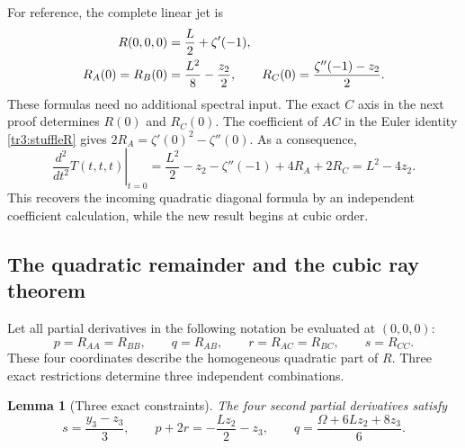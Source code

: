 \documentclass[11pt]{article}
\numberwithin{equation}{section}
\theoremstyle{plain}
\newtheorem{lemma}[theorem]{Lemma}
\theoremstyle{definition}
\theoremstyle{remark}
\begin{document}
For reference, the complete linear jet is
\begin{align}\label{tr3:linearjet}
 R(0,0,0)&=\frac L2+\zeta'(-1),\notag\\
 R_A(0)=R_B(0)&=\frac{L^2}{8}-\frac{z_2}{2},\qquad
 R_C(0)=\frac{\zeta''(-1)-z_2}{2}.
\end{align}
These formulas need no additional spectral input.  The exact $C$ axis
in the next proof determines $R(0)$ and $R_C(0)$.  The coefficient of
$AC$ in the Euler identity \eqref{tr3:stuffleR} gives
$2R_A=\zeta'(0)^2-\zeta''(0)$.  As a consequence,
\[
 \left.\frac{d^2}{dt^2}T(t,t,t)\right|_{t=0}
  =\frac{L^2}{2}-z_2-\zeta''(-1)+4R_A+2R_C
  =L^2-4z_2.
\]
This recovers the incoming quadratic diagonal formula by an independent
coefficient calculation, while the new result begins at cubic order.

\subsection{The quadratic remainder and the cubic ray theorem}

Let all partial derivatives in the following notation be evaluated
at $(0,0,0)$:
\[
 p=R_{AA}=R_{BB},\qquad q=R_{AB},\qquad
 r=R_{AC}=R_{BC},\qquad s=R_{CC}.
\]
These four coordinates describe the homogeneous quadratic part of
$R$.  Three exact restrictions determine three independent combinations.

\begin{lemma}[Three exact constraints]\label{tr3:constraints}
The four second partial derivatives satisfy
\begin{equation}\label{tr3:quadraticjet}
 \boxed{\displaystyle
 s=\frac{y_3-z_3}{3},\qquad
 p+2r=-\frac{Lz_2}{2}-z_3,\qquad
 q=\frac{\Omega+6Lz_2+8z_3}{6}.}
\end{equation}
\end{lemma}
\end{document}
